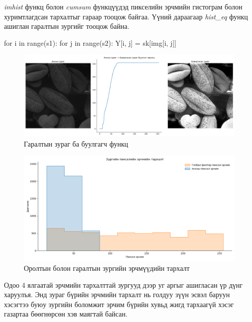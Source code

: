 \documentclass[a4paper]{article}
\begin{document}
\textit{imhist} функц болон \textit{cumsum} функцүүдэд пикселийн эрчмийн гистограм болон хуримтлагдсан тархалтыг гараар тооцож байгаа. Үүний дараагаар \textit{hist\_eq} функц ашиглан гаралтын зургийг тооцож байна.
\begin{python}
for i in range(s1):
        for j in range(s2):
            Y[i, j] = sk[img[i, j]]
\end{python}
\begin{figure}[H]
  \centering
  \includegraphics[scale = 0.30]{global_hist_eq_task_2.png}
  \caption[Intensity 1]{Гаралтын зураг ба буулгагч функц}
\end{figure}
\begin{figure}[H]
  \centering
  \includegraphics[scale = 0.30]{global_hist_eq_task_3.png}
  \caption[Intensity 1]{Оролтын болон гаралтын зургийн эрчмүүдийн тархалт}
\end{figure}
Одоо 4 ялгаатай эрчмийн тархалттай зургууд дээр уг аргыг ашигласан үр дүнг харуулъя. Энд зураг бүрийн эрчмийн тархалт нь голдуу зүүн эсвэл баруун хэсэгтээ буюу зургийн боломжит эрчим бүрийн хувьд жигд тархаагүй хэсэг газартаа бөөгнөрсөн хэв маягтай байсан.
\end{document}
